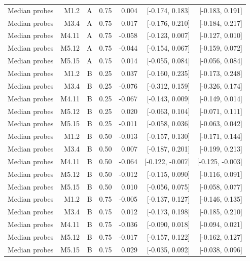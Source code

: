 \begin{longtable}{lrrrrrr}
Median probes & M1.2 & A & 0.75 & 0.004 & [-0.174, 0.183] & [-0.183, 0.191] \\
Median probes & M3.4 & A & 0.75 & 0.017 & [-0.176, 0.210] & [-0.184, 0.217] \\
Median probes & M4.11 & A & 0.75 & -0.058 & [-0.123, 0.007] & [-0.127, 0.010] \\
Median probes & M5.12 & A & 0.75 & -0.044 & [-0.154, 0.067] & [-0.159, 0.072] \\
Median probes & M5.15 & A & 0.75 & 0.014 & [-0.055, 0.084] & [-0.056, 0.084] \\
Median probes & M1.2 & B & 0.25 & 0.037 & [-0.160, 0.235] & [-0.173, 0.248] \\
Median probes & M3.4 & B & 0.25 & -0.076 & [-0.312, 0.159] & [-0.326, 0.174] \\
Median probes & M4.11 & B & 0.25 & -0.067 & [-0.143, 0.009] & [-0.149, 0.014] \\
Median probes & M5.12 & B & 0.25 & 0.020 & [-0.063, 0.104] & [-0.071, 0.111] \\
Median probes & M5.15 & B & 0.25 & -0.011 & [-0.058, 0.036] & [-0.063, 0.042] \\
Median probes & M1.2 & B & 0.50 & -0.013 & [-0.157, 0.130] & [-0.171, 0.144] \\
Median probes & M3.4 & B & 0.50 & 0.007 & [-0.187, 0.201] & [-0.199, 0.213] \\
Median probes & M4.11 & B & 0.50 & -0.064 & [-0.122, -0.007] & [-0.125, -0.003] \\
Median probes & M5.12 & B & 0.50 & -0.012 & [-0.115, 0.090] & [-0.116, 0.091] \\
Median probes & M5.15 & B & 0.50 & 0.010 & [-0.056, 0.075] & [-0.058, 0.077] \\
Median probes & M1.2 & B & 0.75 & -0.005 & [-0.137, 0.127] & [-0.146, 0.135] \\
Median probes & M3.4 & B & 0.75 & 0.012 & [-0.173, 0.198] & [-0.185, 0.210] \\
Median probes & M4.11 & B & 0.75 & -0.036 & [-0.090, 0.018] & [-0.094, 0.021] \\
Median probes & M5.12 & B & 0.75 & -0.017 & [-0.157, 0.122] & [-0.162, 0.127] \\
Median probes & M5.15 & B & 0.75 & 0.029 & [-0.035, 0.092] & [-0.038, 0.096] \\
\bottomrule
\end{longtable}
